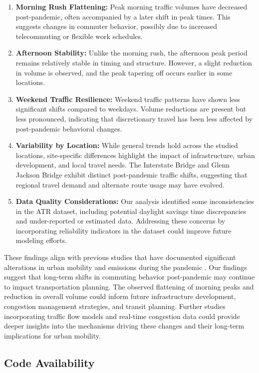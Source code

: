 \documentclass{article}
\begin{document}
\begin{enumerate}
\item \textbf{Morning Rush Flattening:} Peak morning traffic volumes have decreased post-pandemic, often accompanied by a later shift in peak times. This suggests changes in commuter behavior, possibly due to increased telecommuting or flexible work schedules.
\item \textbf{Afternoon Stability:} Unlike the morning rush, the afternoon peak period remains relatively stable in timing and structure. However, a slight reduction in volume is observed, and the peak tapering off occurs earlier in some locations.
\item \textbf{Weekend Traffic Resilience:} Weekend traffic patterns have shown less significant shifts compared to weekdays. Volume reductions are present but less pronounced, indicating that discretionary travel has been less affected by post-pandemic behavioral changes.
\item \textbf{Variability by Location:} While general trends hold across the studied locations, site-specific differences highlight the impact of infrastructure, urban development, and local travel needs. The Interstate Bridge and Glenn Jackson Bridge exhibit distinct post-pandemic traffic shifts, suggesting that regional travel demand and alternate route usage may have evolved.
\item \textbf{Data Quality Considerations:} Our analysis identified some inconsistencies in the ATR dataset, including potential daylight savings time discrepancies and under-reported or estimated data. Addressing these concerns by incorporating reliability indicators in the dataset could improve future modeling efforts.
\end{enumerate}


These findings align with previous studies that have documented significant alterations in urban mobility and emissions during the pandemic \cite{covid_mobility_emissions}. Our findings suggest that long-term shifts in commuting behavior post-pandemic may continue to impact transportation planning. The observed flattening of morning peaks and reduction in overall volume could inform future infrastructure development, congestion management strategies, and transit planning. Further studies incorporating traffic flow models and real-time congestion data could provide deeper insights into the mechanisms driving these changes and their long-term implications for urban mobility.

\subsection{Code Availability}
\end{document}
